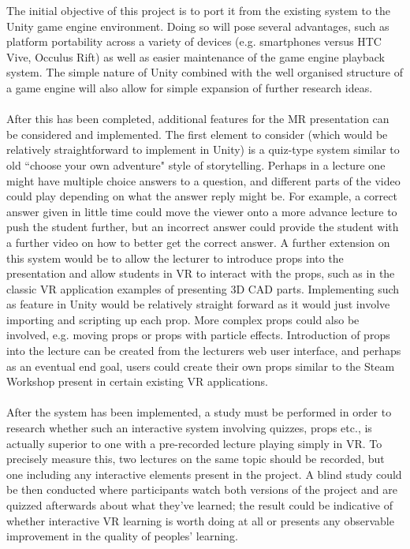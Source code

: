 \documentclass[11pt]{report}
\begin{document}
The initial objective of this project is to port it from the existing system to the Unity game engine environment. Doing so will pose several advantages, such as platform portability across a variety of devices (e.g. smartphones versus HTC Vive, Occulus Rift) as well as easier maintenance of the game engine playback system. The simple nature of Unity combined with the well organised structure of a game engine will also allow for simple expansion of further research ideas.\\~\\
After this has been completed, additional features for the MR presentation can be considered and implemented. The first element to consider (which would be relatively straightforward to implement in Unity) is a quiz-type system similar to old ``choose your own adventure" style of storytelling. Perhaps in a lecture one might have multiple choice answers to a question, and different parts of the video could play depending on what the answer reply might be. For example, a correct answer given in little time could move the viewer onto a more advance lecture to push the student further, but an incorrect answer could provide the student with a further video on how to better get the correct answer. A further extension on this system would be to allow the lecturer to introduce props into the presentation and allow students in VR to interact with the props, such as in the classic VR application examples of presenting 3D CAD parts. Implementing such as feature in Unity would be relatively straight forward as it would just involve importing and scripting up each prop. More complex props could also be involved, e.g. moving props or props with particle effects. Introduction of props into the lecture can be created from the lecturers web user interface, and perhaps as an eventual end goal, users could create their own props similar to the Steam Workshop present in certain existing VR applications\cite{Education2016}.\\~\\
After the system has been implemented, a study must be performed in order to research whether such an interactive system involving quizzes, props etc., is actually superior to one with a pre-recorded lecture playing simply in VR. To precisely measure this, two lectures on the same topic should be recorded, but one including any interactive elements present in the project. A blind study could be then conducted where participants watch both versions of the project and are quizzed afterwards about what they've learned; the result could be indicative of whether interactive VR learning is worth doing at all or presents any observable improvement in the quality of peoples' learning.\\~\\
\end{document}
